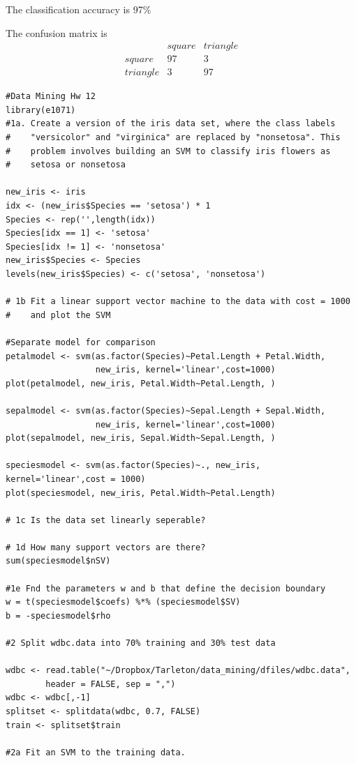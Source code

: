 \documentclass[11pt]{article}
\begin{document}
\begin{enumerate}
The classification accuracy is 97\%

The confusion matrix is 
$$
\begin{matrix}
&       square & triangle \\
  square    &   97  &       3 \\
  triangle  &    3  &     97
\end{matrix}
$$
\end{enumerate}


\begin{Verbatim}
#Data Mining Hw 12
library(e1071)
#1a. Create a version of the iris data set, where the class labels 
#    "versicolor" and "virginica" are replaced by "nonsetosa". This 
#    problem involves building an SVM to classify iris flowers as 
#    setosa or nonsetosa

new_iris <- iris
idx <- (new_iris$Species == 'setosa') * 1
Species <- rep('',length(idx))
Species[idx == 1] <- 'setosa'
Species[idx != 1] <- 'nonsetosa'
new_iris$Species <- Species
levels(new_iris$Species) <- c('setosa', 'nonsetosa')

# 1b Fit a linear support vector machine to the data with cost = 1000 
#    and plot the SVM

#Separate model for comparison
petalmodel <- svm(as.factor(Species)~Petal.Length + Petal.Width, 
                  new_iris, kernel='linear',cost=1000)
plot(petalmodel, new_iris, Petal.Width~Petal.Length, )

sepalmodel <- svm(as.factor(Species)~Sepal.Length + Sepal.Width, 
                  new_iris, kernel='linear',cost=1000)
plot(sepalmodel, new_iris, Sepal.Width~Sepal.Length, )

speciesmodel <- svm(as.factor(Species)~., new_iris, kernel='linear',cost = 1000)
plot(speciesmodel, new_iris, Petal.Width~Petal.Length)

# 1c Is the data set linearly seperable? 

# 1d How many support vectors are there? 
sum(speciesmodel$nSV)

#1e Fnd the parameters w and b that define the decision boundary
w = t(speciesmodel$coefs) %*% (speciesmodel$SV)
b = -speciesmodel$rho

#2 Split wdbc.data into 70% training and 30% test data

wdbc <- read.table("~/Dropbox/Tarleton/data_mining/dfiles/wdbc.data", 
        header = FALSE, sep = ",")
wdbc <- wdbc[,-1]
splitset <- splitdata(wdbc, 0.7, FALSE)
train <- splitset$train

#2a Fit an SVM to the training data.


\end{Verbatim}
\end{document}

